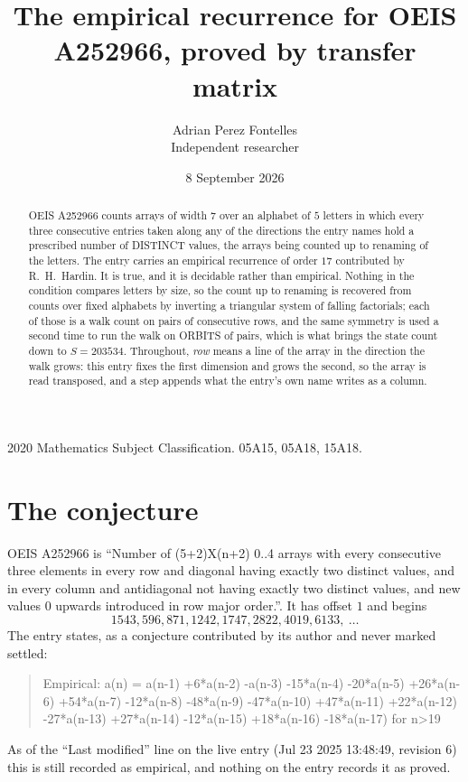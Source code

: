 \documentclass[11pt,a4paper]{article}
\title{The empirical recurrence for OEIS A252966, proved by transfer matrix}
\author{Adrian Perez Fontelles\\ \small Independent researcher}
\date{8 September 2026}
\theoremstyle{plain}
\theoremstyle{definition}
\begin{document}
\maketitle

\begin{abstract}
OEIS A252966 counts arrays of width $7$ over an alphabet of $5$ letters in which every three
consecutive entries taken along any of the directions the entry names hold a prescribed number of
DISTINCT values, the arrays being counted up to renaming of the letters. The entry carries an
empirical recurrence of order $17$ contributed by R.~H.~Hardin. It is true, and it is
decidable rather than empirical. Nothing in the condition compares letters by size, so the
count up to renaming is recovered from counts over fixed alphabets by inverting a triangular
system of falling factorials; each of those is a walk count on pairs of consecutive rows, and
the same symmetry is used a second time to run the walk on ORBITS of pairs, which is what
brings the state count down to $S=203534$.
 Throughout, \emph{row} means a line of the array in the direction the walk grows: this entry fixes the first dimension and grows the second, so the array is read transposed, and a step appends what the entry's own name writes as a column.\end{abstract}

\noindent\small 2020 Mathematics Subject Classification. 05A15, 05A18, 15A18.\normalsize

\section{The conjecture}

OEIS A252966 is ``Number of (5+2)X(n+2) 0..4 arrays with every consecutive three elements in every row and diagonal having exactly two distinct values, and in every column and antidiagonal not having exactly two distinct values, and new values 0 upwards introduced in row major order.''. It has offset $1$ and begins
\[
1543, 596, 871, 1242, 1747, 2822, 4019, 6133,\ \dots
\]
The entry states, as a conjecture contributed by its author and never marked settled:
\begin{quote}
Empirical: a(n) = a(n-1) +6*a(n-2) -a(n-3) -15*a(n-4) -20*a(n-5) +26*a(n-6) +54*a(n-7) -12*a(n-8) -48*a(n-9) -47*a(n-10) +47*a(n-11) +22*a(n-12) -27*a(n-13) +27*a(n-14) -12*a(n-15) +18*a(n-16) -18*a(n-17) for n>19
\end{quote}
As of the ``Last modified'' line on the live entry (Jul 23 2025 13:48:49, revision 6) this is still
recorded as empirical, and nothing on the entry records it as proved.
\end{document}
